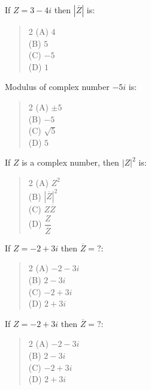 \documentclass[11pt,a4paper]{article}
\begin{document}
\begin{mcqlist}
\item If $Z = 3-4i$ then $|\overline{Z}|$ is:
\begin{quote}\begin{multicols}{2}
\noindent (A) $4$ \\
(B) $5$ \\
(C) $-5$ \\
(D) $1$
\end{multicols}\end{quote}

\item Modulus of complex number $-5i$ is:
\begin{quote}\begin{multicols}{2}
\noindent (A) $\pm5$ \\
(B) $-5$ \\
(C) $\sqrt5$ \\
(D) $5$
\end{multicols}\end{quote}

\item If $Z$ is a complex number, then $|Z|^2$ is:
\begin{quote}\begin{multicols}{2}
\noindent (A) $Z^2$ \\
(B) $|\overline Z|^2$ \\
(C) $Z\overline Z$ \\
(D) $\dfrac{Z}{\overline Z}$
\end{multicols}\end{quote}

\item If $Z=-2+3i$ then $\overline Z = ?$:
\begin{quote}\begin{multicols}{2}
\noindent (A) $-2-3i$ \\
(B) $2-3i$ \\
(C) $-2+3i$ \\
(D) $2+3i$
\end{multicols}\end{quote}

\item If $Z=-2+3i$ then $\overline Z = ?$:
\begin{quote}\begin{multicols}{2}
\noindent (A) $-2-3i$ \\
(B) $2-3i$ \\
(C) $-2+3i$ \\
(D) $2+3i$
\end{multicols}\end{quote}


\end{mcqlist}
\end{document}
